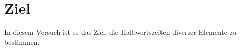 \section{Ziel}
\label{Ziel}

In diesem Versuch ist es das Ziel, die Halbwertszeiten diverser Elemente zu bestimmen.